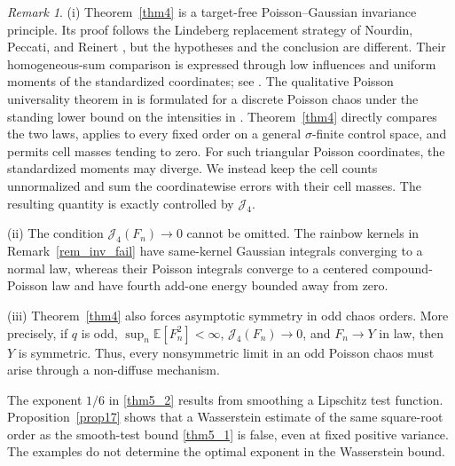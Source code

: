 \documentclass[letterpaper,11pt,reqno]{amsart}
\numberwithin{equation}{section}
\theoremstyle{plain}
\theoremstyle{definition}
\theoremstyle{remark}
\newtheorem{remark}[theorem]{Remark}
\newcommand{\E}{\mathbb{E}}
\newcommand{\Jfour}{\mathcal J_4}
\newcommand{\s}{\sigma}
\begin{document}
\begin{remark}\rm
(i) Theorem~\ref{thm4} is a target-free Poisson--Gaussian invariance
principle.  Its proof follows the Lindeberg replacement strategy of
Nourdin, Peccati, and Reinert \cite{NPR10}, but the hypotheses and the
conclusion are different.  Their homogeneous-sum comparison is
expressed through low influences and uniform moments of the
standardized coordinates; see \cite[Theorems~1.2 and~4.1]{NPR10}.
The qualitative Poisson universality theorem in
\cite[Theorem~3.4]{PZ14} is formulated for a discrete Poisson chaos
under the standing lower bound on the intensities in
\cite[Theorem~3.2 and Remark~3.3]{PZ14}.  Theorem~\ref{thm4} directly
compares the two laws, applies to every fixed order on a general
$\s$-finite control space, and permits cell masses tending to zero.
For such triangular Poisson coordinates, the standardized moments may
diverge.  We instead keep the cell counts unnormalized and sum the
coordinatewise errors with their cell masses.  The resulting quantity
is exactly controlled by $\Jfour$.

(ii) The condition $\Jfour(F_n)\to0$ cannot be omitted.  The rainbow
kernels in Remark~\ref{rem_inv_fail} have same-kernel Gaussian
integrals converging to a normal law, whereas their Poisson integrals
converge to a centered compound-Poisson law and have fourth add-one
energy bounded away from zero.

(iii) Theorem~\ref{thm4} also forces asymptotic symmetry in odd chaos
orders.  More precisely, if $q$ is odd,
$\sup_n\E[F_n^2]<\infty$, $\Jfour(F_n)\to0$, and $F_n\to Y$ in law,
then $Y$ is symmetric.  Thus, every nonsymmetric limit in an odd
Poisson chaos must arise through a non-diffuse mechanism.
\end{remark}

The exponent $1/6$ in \eqref{thm5_2} results from smoothing a
Lipschitz test function.  Proposition~\ref{prop17} shows that a
Wasserstein estimate of the same square-root order as the smooth-test
bound \eqref{thm5_1} is false, even at fixed positive variance.  The
examples do not determine the optimal exponent in the Wasserstein
bound.
\end{document}
